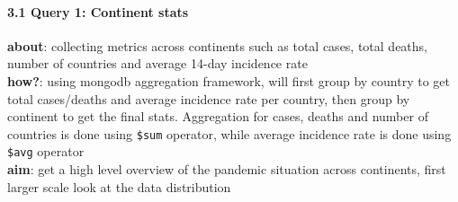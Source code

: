 \documentclass[
]{article}
\newenvironment{Shaded}{}{}
\newcommand{\BuiltInTok}[1]{\textcolor[rgb]{0.00,0.50,0.00}{#1}}
\newcommand{\CommentTok}[1]{\textcolor[rgb]{0.38,0.63,0.69}{\textit{#1}}}
\newcommand{\ControlFlowTok}[1]{\textcolor[rgb]{0.00,0.44,0.13}{\textbf{#1}}}
\newcommand{\DecValTok}[1]{\textcolor[rgb]{0.25,0.63,0.44}{#1}}
\newcommand{\FunctionTok}[1]{\textcolor[rgb]{0.02,0.16,0.49}{#1}}
\newcommand{\KeywordTok}[1]{\textcolor[rgb]{0.00,0.44,0.13}{\textbf{#1}}}
\newcommand{\NormalTok}[1]{#1}
\newcommand{\OperatorTok}[1]{\textcolor[rgb]{0.40,0.40,0.40}{#1}}
\newcommand{\PreprocessorTok}[1]{\textcolor[rgb]{0.74,0.48,0.00}{#1}}
\newcommand{\SpecialCharTok}[1]{\textcolor[rgb]{0.25,0.44,0.63}{#1}}
\newcommand{\StringTok}[1]{\textcolor[rgb]{0.25,0.44,0.63}{#1}}
\newcommand{\VerbatimStringTok}[1]{\textcolor[rgb]{0.25,0.44,0.63}{#1}}
\begin{document}
\begin{Shaded}
\end{Shaded}

\hypertarget{query-1-continent-stats}{%
\paragraph{3.1 Query 1: Continent stats}\label{query-1-continent-stats}}

\textbf{about}: collecting metrics across continents such as total
cases, total deaths, number of countries and average 14-day incidence
rate\\
\textbf{how?}: using mongodb aggregation framework, will first group by
country to get total cases/deaths and average incidence rate per
country, then group by continent to get the final stats. Aggregation for
cases, deaths and number of countries is done using \texttt{\$sum}
operator, while average incidence rate is done using \texttt{\$avg}
operator\\
\textbf{aim}: get a high level overview of the pandemic situation across
continents, first larger scale look at the data distribution
\end{document}
